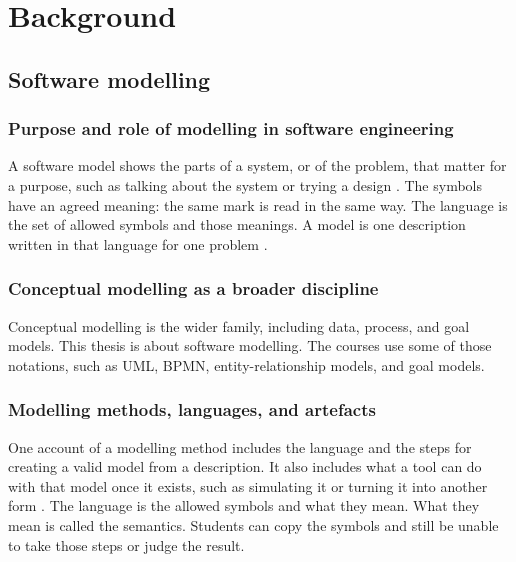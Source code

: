 
%

\chapter{Background}
\label{cha:background}

\section{Software modelling}
\label{sec:software_modelling_conceptual}

\subsection{Purpose and role of modelling in software engineering}
\label{subsec:purpose_role_modelling_se}


A software model shows the parts of a system, or of the problem, that matter for a purpose, such as talking about the system or trying a design \cite{kuhne:DagSemProc.04101.15,gorschek2014design,petre2013uml}. The symbols have an agreed meaning: the same mark is read in the same way. The language is the set of allowed symbols and those meanings. A model is one description written in that language for one problem \cite{kuhne:DagSemProc.04101.15}.

\subsection{Conceptual modelling as a broader discipline}
\label{subsec:conceptual_modelling_broader_discipline}

Conceptual modelling is the wider family, including data, process, and goal models. This thesis is about software modelling. The courses use some of those notations, such as UML, BPMN, entity-relationship models, and goal models.

\subsection{Modelling methods, languages, and artefacts}
\label{subsec:modelling_methods_languages_artefacts}

One account of a modelling method includes the language and the steps for creating a valid model from a description. It also includes what a tool can do with that model once it exists, such as simulating it or turning it into another form \cite{bork2019framework}. The language is the allowed symbols and what they mean. What they mean is called the semantics. Students can copy the symbols and still be unable to take those steps or judge the result.

